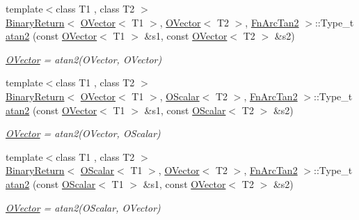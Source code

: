 \begin{DoxyCompactItemize}
{\footnotesize template$<$class T1 , class T2 $>$ }\\\mbox{\hyperlink{structENSEM_1_1BinaryReturn}{Binary\+Return}}$<$ \mbox{\hyperlink{classENSEM_1_1OVector}{O\+Vector}}$<$ T1 $>$, \mbox{\hyperlink{classENSEM_1_1OVector}{O\+Vector}}$<$ T2 $>$, \mbox{\hyperlink{structENSEM_1_1FnArcTan2}{Fn\+Arc\+Tan2}} $>$\+::Type\+\_\+t \mbox{\hyperlink{group__obsvector_gae0d11c0b7d0fc49cc1e2765f21d10a2b}{atan2}} (const \mbox{\hyperlink{classENSEM_1_1OVector}{O\+Vector}}$<$ T1 $>$ \&s1, const \mbox{\hyperlink{classENSEM_1_1OVector}{O\+Vector}}$<$ T2 $>$ \&s2)
\begin{DoxyCompactList}\small\item\em \mbox{\hyperlink{classENSEM_1_1OVector}{O\+Vector}} = atan2(\+O\+Vector, O\+Vector) \end{DoxyCompactList}\item 
{\footnotesize template$<$class T1 , class T2 $>$ }\\\mbox{\hyperlink{structENSEM_1_1BinaryReturn}{Binary\+Return}}$<$ \mbox{\hyperlink{classENSEM_1_1OVector}{O\+Vector}}$<$ T1 $>$, \mbox{\hyperlink{classENSEM_1_1OScalar}{O\+Scalar}}$<$ T2 $>$, \mbox{\hyperlink{structENSEM_1_1FnArcTan2}{Fn\+Arc\+Tan2}} $>$\+::Type\+\_\+t \mbox{\hyperlink{group__obsvector_ga6f583b255bc8225ce768b9b916c9e271}{atan2}} (const \mbox{\hyperlink{classENSEM_1_1OVector}{O\+Vector}}$<$ T1 $>$ \&s1, const \mbox{\hyperlink{classENSEM_1_1OScalar}{O\+Scalar}}$<$ T2 $>$ \&s2)
\begin{DoxyCompactList}\small\item\em \mbox{\hyperlink{classENSEM_1_1OVector}{O\+Vector}} = atan2(\+O\+Vector, O\+Scalar) \end{DoxyCompactList}\item 
{\footnotesize template$<$class T1 , class T2 $>$ }\\\mbox{\hyperlink{structENSEM_1_1BinaryReturn}{Binary\+Return}}$<$ \mbox{\hyperlink{classENSEM_1_1OScalar}{O\+Scalar}}$<$ T1 $>$, \mbox{\hyperlink{classENSEM_1_1OVector}{O\+Vector}}$<$ T2 $>$, \mbox{\hyperlink{structENSEM_1_1FnArcTan2}{Fn\+Arc\+Tan2}} $>$\+::Type\+\_\+t \mbox{\hyperlink{group__obsvector_gaf9e56538a48f9abad6df1dda8297795b}{atan2}} (const \mbox{\hyperlink{classENSEM_1_1OScalar}{O\+Scalar}}$<$ T1 $>$ \&s1, const \mbox{\hyperlink{classENSEM_1_1OVector}{O\+Vector}}$<$ T2 $>$ \&s2)
\begin{DoxyCompactList}\small\item\em \mbox{\hyperlink{classENSEM_1_1OVector}{O\+Vector}} = atan2(\+O\+Scalar, O\+Vector) \end{DoxyCompactList}\item 

\end{DoxyCompactItemize}
